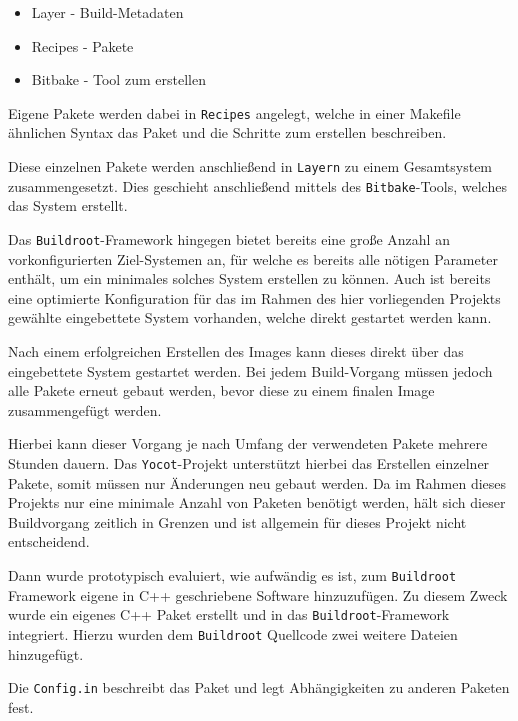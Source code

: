 \begin{itemize}
\tightlist
\item
  Layer - Build-Metadaten
\item
  Recipes - Pakete
\item
  Bitbake - Tool zum erstellen
\end{itemize}

Eigene Pakete werden dabei in \passthrough{\lstinline!Recipes!}
angelegt, welche in einer Makefile ähnlichen Syntax das Paket und die
Schritte zum erstellen beschreiben.

Diese einzelnen Pakete werden anschließend in
\passthrough{\lstinline!Layern!} zu einem Gesamtsystem zusammengesetzt.
Dies geschieht anschließend mittels des
\passthrough{\lstinline!Bitbake!}-Tools, welches das System erstellt.

Das \passthrough{\lstinline!Buildroot!}-Framework hingegen bietet
bereits eine große Anzahl an vorkonfigurierten Ziel-Systemen an, für
welche es bereits alle nötigen Parameter enthält, um ein minimales
solches System erstellen zu können. Auch ist bereits eine optimierte
Konfiguration für das im Rahmen des hier vorliegenden Projekts gewählte
eingebettete System vorhanden, welche direkt gestartet werden kann.

Nach einem erfolgreichen Erstellen des Images kann dieses direkt über
das eingebettete System gestartet werden. Bei jedem Build-Vorgang müssen
jedoch alle Pakete erneut gebaut werden, bevor diese zu einem finalen
Image zusammengefügt werden.

Hierbei kann dieser Vorgang je nach Umfang der verwendeten Pakete
mehrere Stunden dauern. Das \passthrough{\lstinline!Yocot!}-Projekt
unterstützt hierbei das Erstellen einzelner Pakete, somit müssen nur
Änderungen neu gebaut werden. Da im Rahmen dieses Projekts nur eine
minimale Anzahl von Paketen benötigt werden, hält sich dieser
Buildvorgang zeitlich in Grenzen und ist allgemein für dieses Projekt
nicht entscheidend.

Dann wurde prototypisch evaluiert, wie aufwändig es ist, zum
\passthrough{\lstinline!Buildroot!} Framework eigene in C++ geschriebene
Software hinzuzufügen. Zu diesem Zweck wurde ein eigenes C++ Paket
erstellt und in das \passthrough{\lstinline!Buildroot!}-Framework
integriert. Hierzu wurden dem \passthrough{\lstinline!Buildroot!}
Quellcode zwei weitere Dateien hinzugefügt.

Die \passthrough{\lstinline!Config.in!} beschreibt das Paket und legt
Abhängigkeiten zu anderen Paketen fest.

